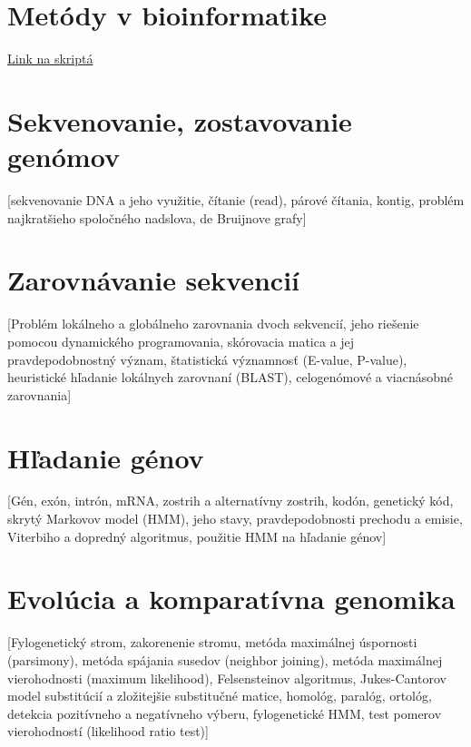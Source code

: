 \chapter[Metódy v bioinformatike]{Metódy v bioinformatike}
\label{metody_v_bioinformatike.tex} %

\href{http://compbio.fmph.uniba.sk/vyuka/mbi/index.php/Predn%C3%A1%C5%A1ky_a_pozn%C3%A1mky}{Link na skriptá}

\chapter{Sekvenovanie, zostavovanie genómov​}

	[sekvenovanie DNA a jeho využitie, čítanie (read), párové čítania, kontig, problém najkratšieho spoločného nadslova, de Bruijnove grafy]

\chapter{Zarovnávanie sekvencií​}

	[Problém lokálneho a globálneho zarovnania dvoch sekvencií, jeho riešenie pomocou dynamického programovania, skórovacia matica a jej pravdepodobnostný význam, štatistická významnosť (E-value, P-value), heuristické hľadanie lokálnych zarovnaní (BLAST), celogenómové a viacnásobné zarovnania]

\chapter{Hľadanie génov​}

	[Gén, exón, intrón, mRNA, zostrih a alternatívny zostrih, kodón, genetický kód, skrytý Markovov model (HMM), jeho stavy, pravdepodobnosti prechodu a emisie, Viterbiho a dopredný algoritmus, použitie HMM na hľadanie génov]

\chapter{Evolúcia a komparatívna genomika}

	[Fylogenetický strom, zakorenenie stromu, metóda maximálnej úspornosti (parsimony), metóda spájania susedov (neighbor joining), metóda maximálnej vierohodnosti (maximum likelihood), Felsensteinov algoritmus, Jukes-Cantorov model substitúcií a zložitejšie substitučné matice, homológ, paralóg, ortológ, detekcia pozitívneho a negatívneho výberu, fylogenetické HMM, test pomerov vierohodností (likelihood ratio test)]

